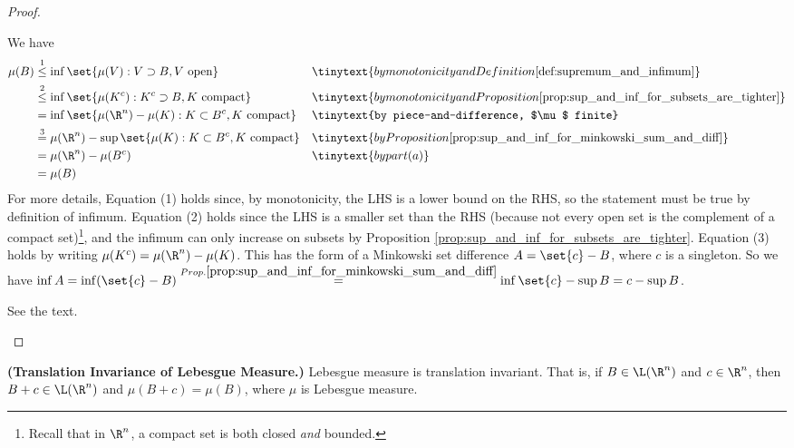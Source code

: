 \documentclass{article} %
\begin{document}
\begin{proof}
\begin{alphabate}
We have 
\begin{align*}
\mu(B) & \stackrel{1}{\leq}	\inf \set{\mu(V) : V \supset B, V \text{ open}} && \tinytext{by monotonicity and Definition \ref{def:supremum_and_infimum}} \\
 & \stackrel{2}{\leq}	\inf \set{\mu(K^c) : K^c \supset B, K \text{ compact}} && \tinytext{by monotonicity and Proposition \ref{prop:sup_and_inf_for_subsets_are_tighter}} \\
 &= \inf \set{\mu(\R^n) - \mu(K) : K \subset B^c, K \text{ compact}} && \tinytext{by piece-and-difference, $\mu$ finite} \\
 & \stackrel{3}{=}	\mu(\R^n) - \sup \set{\mu(K) : K \subset B^c, K \text{ compact}} && \tinytext{by Proposition \ref{prop:sup_and_inf_for_minkowski_sum_and_diff}} \\
  & =	\mu(\R^n) - \mu(B^c)  && \tinytext{by part (a)}\\
&= \mu(B)
\end{align*}
For more details, Equation (1) holds since, by monotonicity, the LHS is a lower bound on the RHS, so the statement must be true by definition of infimum. Equation (2) holds since the LHS is a smaller set than the RHS (because not every open set is the complement of a compact set)\footnote{Recall that in $\R^n$, a compact set is both closed \textit{and} bounded.}, and the infimum can only increase on subsets by Proposition \ref{prop:sup_and_inf_for_subsets_are_tighter}. Equation (3) holds by writing $\mu(K^c) = \mu(\R^n) - \mu(K)$.  This has the form of a Minkowski set difference $A = \set{c} - B$, where $c$ is a singleton.  So we have $\inf A = \inf ( \set{c} - B) \stackrel{Prop. \ref{prop:sup_and_inf_for_minkowski_sum_and_diff}}{=} \inf \set{c} - \sup B = c - \sup B$. 
\item See the text.
\end{alphabate}
 
 \end{proof}


\begin{proposition}
\textbf{(Translation Invariance of Lebesgue Measure.)} Lebesgue measure is translation invariant.  That is, if $B \in \L(\R^n)$ and $c \in \R^n$, then $B+c \in  \L(\R^n)$ and $\mu(B+c)=\mu(B)$, where $\mu$ is Lebesgue measure.	
\label{prop:Lebesgue_measure_is_translation_invariant}
\end{proposition}
\end{document}
